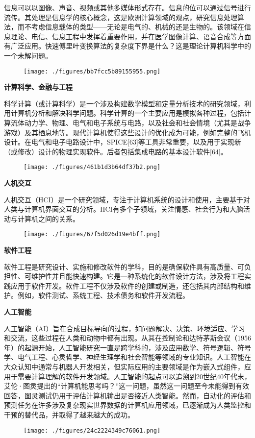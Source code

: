 信息可以以图像、声音、视频或其他多媒体形式存在。信息的位可以通过信号进行流传。其处理是信息学的核心概念，这是欧洲计算领域的观点，研究信息处理算法，而不考虑信息载体的类型——无论是电气的、机械的还是生物的。该领域在信息理论、电信、信息工程中发挥着重要作用，并在医学图像计算、语音合成等方面有广泛应用。快速傅里叶变换算法的复杂度下界是什么？这是理论计算机科学中的一个未解问题。
\begin{figure}[ht]
\centering
\texttt{[image: ./figures/bb7fcc5b89155955.png]}
\caption{} \label{fig_JSS_9}
\end{figure}
\textbf{计算科学、金融与工程}  

科学计算（或计算科学）是一个涉及构建数学模型和定量分析技术的研究领域，利用计算机分析和解决科学问题。科学计算的一个主要应用是模拟各种过程，包括计算流体动力学、物理、电气和电子系统与电路，以及社会和社会情境（尤其是战争游戏）及其栖息地等。现代计算机使得这些设计的优化成为可能，例如完整的飞机设计。在电气和电子电路设计中，SPICE[63]等工具非常重要，以及用于实现新（或修改）设计的物理实现软件。后者包括集成电路的基本设计软件[64]。
\begin{figure}[ht]
\centering
\texttt{[image: ./figures/461b1d3b64df37b2.png]}
\caption{} \label{fig_JSS_10}
\end{figure}
\textbf{人机交互} 

人机交互（HCI）是一个研究领域，专注于计算机系统的设计和使用，主要基于对人类与计算机界面交互的分析。HCI有多个子领域，关注情感、社会行为和大脑活动与计算机之间的关系。
\begin{figure}[ht]
\centering
\texttt{[image: ./figures/67f5d026d19e4bff.png]}
\caption{} \label{fig_JSS_11}
\end{figure}
\textbf{软件工程}  
  
软件工程是研究设计、实施和修改软件的学科，目的是确保软件具有高质量、可负担性、可维护性并且能快速构建。它是一种系统化的软件设计方法，涉及将工程实践应用于软件开发。软件工程不仅涉及软件的创建或制造，还包括其内部结构和维护。例如，软件测试、系统工程、技术债务和软件开发流程。

\textbf{人工智能}  
  
人工智能（AI）旨在合成目标导向的过程，如问题解决、决策、环境适应、学习和交流，这些过程在人类和动物中都有出现。从其在控制论和达特茅斯会议（1956年）的起源开始，人工智能研究一直是跨学科的，涉及应用数学、符号逻辑、符号学、电气工程、心灵哲学、神经生理学和社会智能等领域的专业知识。人工智能在大众认知中通常与机器人开发相关，但实际应用的主要领域是作为嵌入式组件，应用于需要计算理解的软件开发领域。人工智能的起点可以追溯到20世纪40年代末，艾伦·图灵提出的“计算机能思考吗？”这一问题，虽然这一问题至今未能得到有效回答，图灵测试仍用于评估计算机输出是否接近人类智能。然而，自动化的评估和预测任务在许多涉及复杂现实世界数据的计算机应用领域，已逐渐成为人类监控和干预的替代品，并取得了越来越大的成功。
\begin{figure}[ht]
\centering
\texttt{[image: ./figures/24c2224349c76061.png]}
\caption{} \label{fig_JSS_12}
\end{figure}
